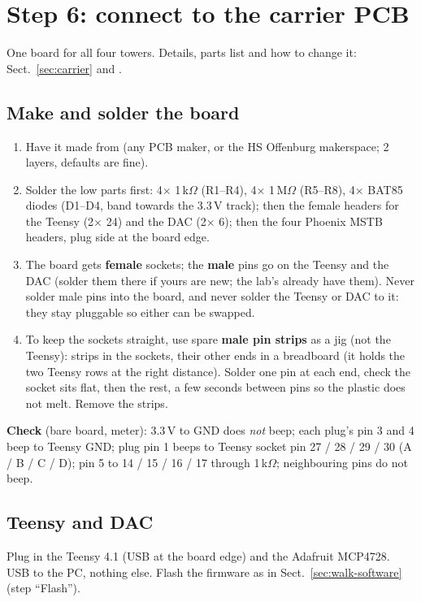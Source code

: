 \section{Step 6: connect to the carrier PCB}\label{sec:walk-pcb}
One board for all four towers. Details, parts list and how to change it: Sect.~\ref{sec:carrier} and
.

\subsection{Make and solder the board}
\begin{enumerate}
\item Have it made from  (any PCB maker, or the
HS Offenburg makerspace; 2 layers, defaults are fine).
\item Solder the low parts first: 4$\times$ 1\,k$\Omega$ (R1--R4), 4$\times$ 1\,M$\Omega$ (R5--R8),
4$\times$ BAT85 diodes (D1--D4, band towards the 3.3\,V track); then the female headers for the Teensy
(2$\times$ 24) and the DAC (2$\times$ 6); then the four Phoenix MSTB headers, plug side at the board edge.
\item The board gets \textbf{female} sockets; the \textbf{male} pins go on the Teensy and the DAC (solder
them there if yours are new; the lab's already have them). Never solder male pins into the board, and never
solder the Teensy or DAC to it: they stay pluggable so either can be swapped.
\item To keep the sockets straight, use spare \textbf{male pin strips} as a jig (not the Teensy): strips in
the sockets, their other ends in a breadboard (it holds the two Teensy rows at the right distance). Solder one
pin at each end, check the socket sits flat, then the rest, a few seconds between pins so the plastic does not
melt. Remove the strips.
\end{enumerate}
\textbf{Check} (bare board, meter): 3.3\,V to GND does \emph{not} beep; each plug's pin 3 and 4 beep to
Teensy GND; plug pin 1 beeps to Teensy socket pin 27 / 28 / 29 / 30 (A / B / C / D); pin 5 to 14 / 15 / 16 /
17 through 1\,k$\Omega$; neighbouring pins do not beep.

\subsection{Teensy and DAC}
Plug in the Teensy 4.1 (USB at the board edge) and the Adafruit MCP4728. USB to the PC, nothing else.
Flash the firmware as in Sect.~\ref{sec:walk-software} (step ``Flash'').

